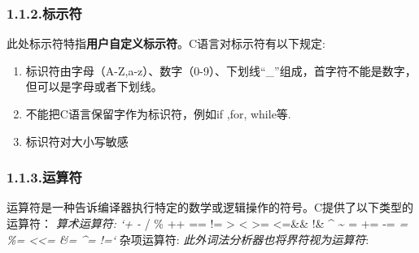 \documentclass{article}
\begin{document}
\subsubsection{1.1.2.\hspace*{0.5em}标示符}\label{section}%

\noindent{}此处标示符特指\textbf{用户自定义标示符}。C语言对标示符有以下规定:%

\begin{enumerate}[noitemsep,topsep=\mdcompacttopsep]%

\item{}标识符由字母（A-Z,a-z）、数字（0-9）、下划线“\_”组成，首字符不能是数字，但可以是字母或者下划线。%

\item{}不能把C语言保留字作为标识符，例如if ,for, while等.%

\item{}标识符对大小写敏感%
\end{enumerate}%

\subsubsection{1.1.3.\hspace*{0.5em}运算符}\label{section}%

\noindent{}运算符是一种告诉编译器执行特定的数学或逻辑操作的符号。C提供了以下类型的运算符：
\emph{ 算术运算符: `+ - } / \% ++ \textendash{}== != \textgreater{} \textless{} \textgreater{}= \textless{}=\&\& \textbar{}\textbar{} !\& \textbar{} \textasciicircum{} \textasciitilde{} \guillemotleft{} \guillemotright{}= += -= \emph{= \%= \textless{}\textless{}= \&= \textasciicircum{}= !=`
} 杂项运算符: 
\emph{此外词法分析器也将}\emph{界符}\emph{视为运算符}:%
\end{document}
